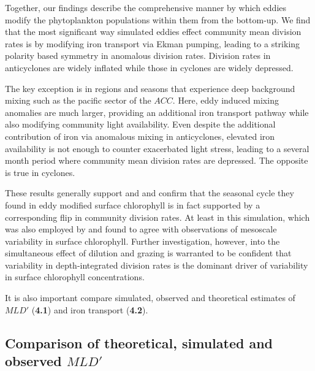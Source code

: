 \documentclass{article}
\begin{document}
Together, our findings describe the comprehensive manner by which eddies modify the phytoplankton populations within them from the bottom-up. We find that the most significant way simulated eddies effect community mean division rates is by modifying iron transport via Ekman pumping, leading to a striking polarity based symmetry in anomalous  division rates. Division rates in anticyclones are widely inflated while those in cyclones are widely depressed.

The key exception is in regions and seasons that experience deep background mixing such as the pacific sector of the $ACC$. Here, eddy induced mixing anomalies are much larger, providing an additional iron transport pathway while also modifying community light availability.  Even despite the additional contribution of iron via anomalous mixing in anticyclones, elevated iron availability is not enough to counter exacerbated light stress, leading to a several month period where community mean division rates are depressed. The opposite is true in cyclones.

These results generally support  \textcite{SongSeasonalvariationcorrelation2018} and \textcite{FrengerImprintSouthernOcean2018} 
and confirm that the seasonal cycle they found in eddy modified surface chlorophyll is in fact supported by a corresponding flip in community division rates. At least in this simulation, which was also employed by \textcite{SongSeasonalvariationcorrelation2018} and found to agree with observations of mesoscale variability in surface chlorophyll. Further investigation, however, into the simultaneous effect of dilution and grazing is warranted to be confident that variability in depth-integrated division rates is the dominant driver of variability in surface chlorophyll concentrations. 

It is also important compare simulated, observed and theoretical estimates of $MLD'$ (\textbf{4.1}) and iron transport (\textbf{4.2}). 


    
\subsection{Comparison of theoretical, simulated and observed $MLD'$}
\end{document}
